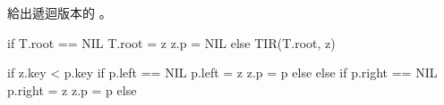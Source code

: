 \startEXERCISE
給出遞迴版本的 。
\stopEXERCISE

\startANSWER
{}
\startCLRSCODE
if T.root == NIL
	T.root = z
	z.p = NIL
else
	TIR(T.root, z)
\stopCLRSCODE

\startCLRSCODE
if z.key < p.key
	if p.left == NIL
		p.left = z
		z.p = p
	else
else
	if p.right == NIL
		p.right = z
		z.p = p
	else
\stopCLRSCODE
\stopANSWER
